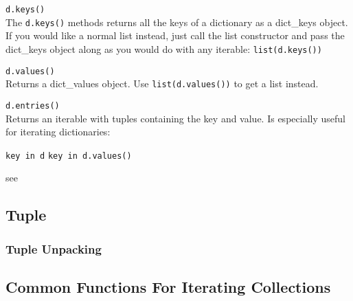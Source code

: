 \begin{itemize}
             \texttt{d.keys()} \\
            The \texttt{d.keys()} methods returns all the keys of a dictionary as a
            dict\_keys
            object. If you would like a normal list instead, just call the list constructor and pass
            the dict\_keys object along as you would do with any iterable:
            \texttt{list(d.keys())}

             \texttt{d.values()} \\
            Returns a dict\_values object. Use \texttt{list(d.values())} to get a list
            instead.

             \texttt{d.entries()} \\
            Returns an iterable with tuples containing the key and value.
            Is especially useful for iterating dictionaries:


            \begin{itemize}
                 \texttt{key in d}
                 \texttt{key in d.values()}
            \end{itemize}

             see 

        \end{itemize}


    \subsection{Tuple}

        \subsubsection{Tuple Unpacking}

    \subsection{Common Functions For Iterating Collections}
